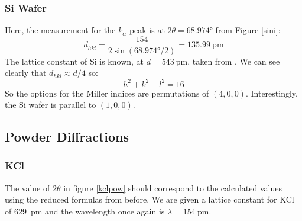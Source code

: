 \documentclass[letterpaper,12pt]{article}
\begin{document}
\subsubsection{Si Wafer}
Here, the measurement for the $k_\alpha$ peak is at $2\theta=\ang{68.974}$ from Figure \ref{sini}:
\begin{equation}
  d_{hkl}=\frac{154}{2\sin(\ang{68.974}/2)}=\boxed{\SI{135.99}{\pico\meter}}
\end{equation}
The lattice constant of Si is known, at $d=\SI{543}{\pico\meter}$, taken from \cite{si}. We can see clearly that $d_{hkl}\approx d/4$ so:
\begin{equation}
  h^2+k^2+l^2=16
\end{equation}
So the options for the Miller indices are permutations of $(4,0,0)$. Interestingly, the Si wafer is parallel to $(1,0,0)$. 

\subsection{Powder Diffractions}
\subsubsection{KCl}
The value of $2\theta$ in figure \ref{kclpow} should correspond to the calculated values using the reduced formulas from before. We are given a lattice constant for KCl of \SI{629}{\pico\meter} and the wavelength once again is $\lambda=\SI{154}{\pico\meter}$.
\end{document}
